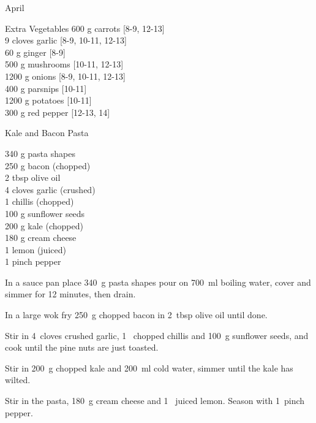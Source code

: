 \begin{menu}{April}
      \begin{shoppinglist}{Extra Vegetables}
      600 g carrots {\scriptsize[8-9, 12-13]}\\
      9 cloves garlic {\scriptsize[8-9, 10-11, 12-13]}\\
      60 g ginger {\scriptsize[8-9]}\\
      500 g mushrooms {\scriptsize[10-11, 12-13]}\\
      1200 g onions {\scriptsize[8-9, 10-11, 12-13]}\\
      400 g parsnips {\scriptsize[10-11]}\\
      1200 g potatoes {\scriptsize[10-11]}\\
      300 g red pepper {\scriptsize[12-13, 14]}\\
      \end{shoppinglist}%
      \par\vfil %
    \vfil\clearpage
  
    \begin{recipe}{2}{Kale and Bacon Pasta}%
		\begin{ingredients}
		340 g pasta shapes  \\
	250 g bacon (chopped) \\
	2 tbsp olive oil  \\
	4 cloves garlic (crushed) \\
	1  chillis (chopped) \\
	100 g sunflower seeds  \\
	200 g kale (chopped) \\
	180 g cream cheese  \\
	1  lemon (juiced) \\
	1 pinch pepper  \\
	
		\end{ingredients}
	
	
    \begin{instructions}
    \item 
    In a
    sauce pan
    place
    340~g  pasta shapes
    pour on
    700~ml  boiling water,
    cover and simmer for 12 minutes, then drain.
  \item 
        In a large wok fry
        250~g chopped bacon
        in
        2~tbsp  olive oil
        until done.
      \item 
        Stir in
        4~cloves crushed garlic,
        1~ chopped chillis
        and
        100~g  sunflower seeds,
        and cook until the pine nuts are just toasted.
      \item 
        Stir in
        200~g chopped kale
        and
        200~ml  cold water,
        simmer until the kale has wilted.
      \item 
        Stir in the pasta,
        180~g  cream cheese
        and
        1~ juiced lemon.
        Season with
        1~pinch  pepper.
      

\end{instructions}
\end{recipe}
\end{menu}
